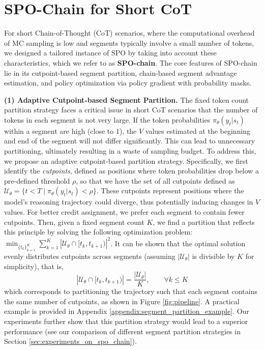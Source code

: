 \vspace{-0.2cm}
\section{SPO-Chain for Short CoT}
\label{sec:chain-like-spo-for-short-cot-scenario}
\vspace{-0.2cm}

For short Chain-of-Thought (CoT) scenarios, where the computational overhead of MC sampling is low and segments typically involve a small number of tokens, we designed a tailored instance of SPO by taking into account these characteristics, which we refer to as \textbf{SPO-chain}. The core features of SPO-chain lie in its cutpoint-based segment partition, chain-based segment advantage estimation, and policy optimization via policy gradient with probability masks.

\noindent\textbf{(1) Adaptive Cutpoint-based Segment Partition.}
\label{subsec:segment-partition-based-on-fixed-cutpoint-intervals}
The fixed token count partition strategy faces a critical issue in short CoT scenarios that the number of tokens in each segment is not very large. 
If the token probabilities \(\pi_\theta(y_t|s_t)\) within a segment are high (close to $1$), the $V$ values estimated at the beginning and end of the segment will not differ significantly. This can lead to unnecessary partitioning, ultimately resulting in a waste of sampling budget. To address this, we propose an adaptive cutpoint-based partition strategy. Specifically, we first identify the \textit{cutpoints}, defined as positions where token probabilities drop below a pre-defined threshold \(\rho\), so that we have the set of all cutpoints defined as
\( \mathcal U_\theta = \{t< T \mid \pi_{\theta}(y_t|s_t) < \rho\} \). These cutpoints represent positions where the model's reasoning trajectory could diverge, thus potentially inducing changes in $V$ values. For better credit assignment, we prefer each segment to contain fewer cutpoints. Then, given a fixed segment count \(K\), we find a partition that reflects this principle by solving the following optimization problem: \(\min_{\{t_k\}_{k=1}^{K}} \sum_{k=1}^{K}|\mathcal U_\theta \cap[t_k,t_{k+1})|^2\). It can be shown that the optimal solution evenly distributes cutpoints across segments (assuming \(|\mathcal{U}_\theta|\) is divisible by \(K\) for simplicity), that is, 
\[ \left|\mathcal U_\theta\cap[t_k,t_{k+1})\right |=\frac{|\mathcal U_\theta|}{K}, \qquad  \forall k \le K \] 
which corresponds to partitioning the trajectory such that each segment contains the same number of cutpoints, as shown in Figure \ref{fig:pipeline}. A practical example is provided in Appendix \ref{appendix:segment_partition_example}. Our experiments further show that this partition strategy would lead to a superior performance (see our comparison of different segment partition strategies in Section \ref{sec:experiments_on_spo_chain}).

